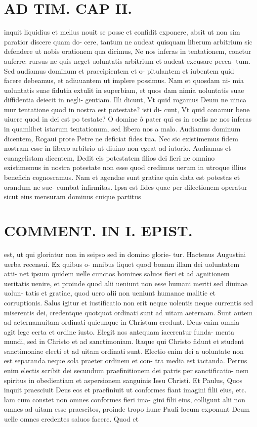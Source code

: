 \documentclass{article}
\begin{document}
\begin{pages}
\section*{AD TIM. CAP II. }
\marginpar{[ p.114 ]}\pstart inquit liquidius et melius nouit se posse et confidit exponere, absit ut non sim paratior discere quam do- cere, tantum ne audeat quisquam liberum arbitrium sic defendere ut nobis orationem qua dicimus, Ne nos inferas in tentationem, conetur auferre: rursus ne quis neget uoluntatis arbitrium et audeat excusare pecca- tum. Sed audiamus dominum et praecipientem et o- pitulantem et iubentem quid facere debeamus, et adiuuantem ut implere possimus. Nam et quosdam ni- mia uoluntatis suae fidutia extulit in superbiam, et quos dam nimia uoluntatis suae diffidentia deiecit in negli- gentiam. Illi dicunt, Vt quid rogamus Deum ne uinca mur tentatione quod in nostra est potestate? isti di- cunt, Vt quid conamur bene uiuere quod in dei est po testate? O domine ô pater qui es in coelis ne nos inferas in quamlibet istarum tentationum, sed libera nos a malo. Audiamus dominum dicentem, Rogaui prote Petre ne deficiat fides tua. Nec sic existimemus fidem nostram esse in libero arbitrio ut diuino non egeat ad iutorio. Audiamus et euangelistam dicentem, Dedit eis potestatem filios dei fieri ne omnino existimemus in nostra potestate non esse quod credimus uerum in utroque illius beneficia cognoscamus. Nam et agendae sunt gratiae quia data est potestas et orandum ne suc- cumbat infirmitas. Ipsa est fides quae per dilectionem operatur sicut eius mensuram dominus cuique partitus  \pend
\section*{COMMENT. IN I. EPIST. }\pstart est, ut qui gloriatur non in seipso sed in domino glorie- tur. Hactenus Augustini uerba recensui. Ex quibus o- mnibus liquet quod bonam illam dei uoluntatem atti- net ipsum quidem uelle cunctos homines saluos fieri et ad agnitionem ueritatis uenire, et proinde quod alii ueniunt non esse humani meriti sed diuinae uolun- tatis et gratiae, quod uero alii non ueniunt humanae malitie et corruptionis. Salus igitur et iustificatio non erit neque uolentis neque currentis sed miserentis dei, credentque quotquot ordinati sunt ad uitam aeternam. Sunt autem ad aeternamuitam ordinati quicunque in Christum credunt. Deus enim omnia agit lege certa et ordine iusto. Elegit nos antequam iacerentur funda- menta mundi, sed in Christo et ad sanctimoniam. ltaque qui Christo fidunt et student sanctimoniae electi et ad uitam ordinati sunt. Electio enim dei a uoluntate non est separanda neque sola praeter ordinem et con- tra media est iactanda. Petrus enim electis scribit dei secundum praefinitionem dei patris per sanctificatio- nem spiritus in obedientiam et aspersionem sanguinis Iesu Christi. Et Paulus, Quos inquit praesciuit Deus eos et praefiniuit ut conformes fiant imagini filii eius, etc. lam cum constet non omnes conformes fieri ima- gini filii eius, colligunt alii non omnes ad uitam esse praescitos, proinde tropo hunc Pauli locum exponunt Deum uelle omnes credentes saluos facere. Quod et  \pend

\end{pages}
\end{document}
